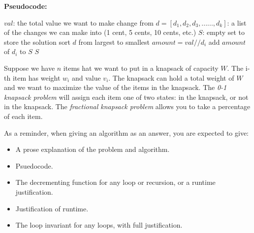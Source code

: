 \documentclass{article}
\begin{document}
\textbf{Pseudocode:}
\begin{algorithm}
            \begin{algorithmic}
            \State $val$: the total value we want to make change from
            \State $d = [d_1, d_2, d_3, ......, d_k]$: a list of the changes we can make into (1 cent, 5 cents, 10 cents, etc.)
                    \State $S$: empty set to store the solution
                    \State sort $d$ from largest to smallest
                        \State $amount = val // d_i$
                        \State add $amount$ of $d_i$ to $S$  
                    \EndFor
                    \newline
                    \Return $S$
                \EndFunction
            \end{algorithmic}
            \end{algorithm}


\nextprob
Suppose we have $n$ items hat we want to put in a knapsack of capacity $W$.  The i-th item has
weight $w_i$ and value $v_i$.  The knapsack can hold a total weight of $W$ and
we want to maximize the value of the items in the knapsack.
The \emph{0-1 knapsack problem} will assign each item one of two states: in the
knapsack, or not in the knapsack.  The \emph{fractional knapsack problem} allows
you to take a percentage of each item.

As a reminder, when giving an algorithm as an answer, you
are expected to give:
\begin{itemize}
    \item A prose explanation of the problem and algorithm.
    \item Psuedocode.
    \item The decrementing function for any loop or recursion, or a runtime
        justification.
    \item Justification of runtime.
    \item The loop invariant for any loops, with full justification.
\end{itemize}
\end{document}
